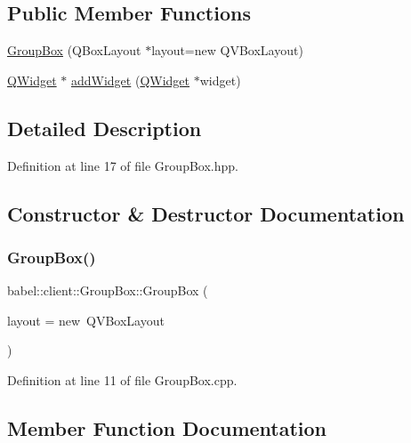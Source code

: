 \subsection*{Public Member Functions}
\begin{DoxyCompactItemize}
\item 
\mbox{\hyperlink{classbabel_1_1client_1_1_group_box_a465566b1a463f96095b36ca6ccc274f9}{Group\+Box}} (Q\+Box\+Layout $\ast$layout=new Q\+V\+Box\+Layout)
\item 
\mbox{\hyperlink{class_q_widget}{Q\+Widget}} $\ast$ \mbox{\hyperlink{classbabel_1_1client_1_1_group_box_acbbed4219ae4b4b8d6b90beaad1c3fe0}{add\+Widget}} (\mbox{\hyperlink{class_q_widget}{Q\+Widget}} $\ast$widget)
\end{DoxyCompactItemize}


\subsection{Detailed Description}


Definition at line 17 of file Group\+Box.\+hpp.



\subsection{Constructor \& Destructor Documentation}
\mbox{\label{classbabel_1_1client_1_1_group_box_a465566b1a463f96095b36ca6ccc274f9}} 
\subsubsection{\texorpdfstring{Group\+Box()}{GroupBox()}}
{\footnotesize\ttfamily babel\+::client\+::\+Group\+Box\+::\+Group\+Box (\begin{DoxyParamCaption}\item[{Q\+Box\+Layout $\ast$}]{layout = {\ttfamily new~QVBoxLayout} }\end{DoxyParamCaption})}



Definition at line 11 of file Group\+Box.\+cpp.



\subsection{Member Function Documentation}
\mbox{\label{classbabel_1_1client_1_1_group_box_acbbed4219ae4b4b8d6b90beaad1c3fe0}} 
